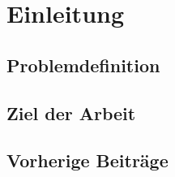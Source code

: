
\chapter{Einleitung}\label{chapter:introduction}
\section{Problemdefinition}
\section{Ziel der Arbeit}
\section{Vorherige Beiträge}
